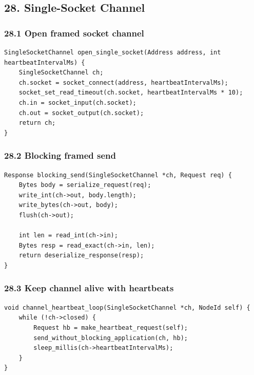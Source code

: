\documentclass[10pt,letterpaper]{article}
\begin{document}
\subsection*{28. Single-Socket Channel}

\subsubsection*{28.1 Open framed socket channel}

\begin{verbatim}
SingleSocketChannel open_single_socket(Address address, int heartbeatIntervalMs) {
    SingleSocketChannel ch;
    ch.socket = socket_connect(address, heartbeatIntervalMs);
    socket_set_read_timeout(ch.socket, heartbeatIntervalMs * 10);
    ch.in = socket_input(ch.socket);
    ch.out = socket_output(ch.socket);
    return ch;
}
\end{verbatim}

\subsubsection*{28.2 Blocking framed send}

\begin{verbatim}
Response blocking_send(SingleSocketChannel *ch, Request req) {
    Bytes body = serialize_request(req);
    write_int(ch->out, body.length);
    write_bytes(ch->out, body);
    flush(ch->out);

    int len = read_int(ch->in);
    Bytes resp = read_exact(ch->in, len);
    return deserialize_response(resp);
}
\end{verbatim}

\subsubsection*{28.3 Keep channel alive with heartbeats}

\begin{verbatim}
void channel_heartbeat_loop(SingleSocketChannel *ch, NodeId self) {
    while (!ch->closed) {
        Request hb = make_heartbeat_request(self);
        send_without_blocking_application(ch, hb);
        sleep_millis(ch->heartbeatIntervalMs);
    }
}
\end{verbatim}
\end{document}
